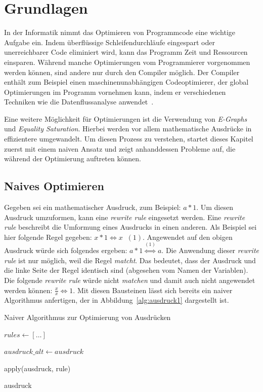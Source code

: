\section{Grundlagen}\label{sec:grundlagen}

In der Informatik nimmt das Optimieren von Programmcode eine wichtige Aufgabe ein.
Indem überflüssige Schleifendurchläufe eingespart oder unerreichbarer Code eliminiert wird,
kann das Programm Zeit und Ressourcen einsparen. 
Während manche Optimierungen vom Programmierer vorgenommen werden können, sind andere nur 
durch den Compiler möglich.
Der Compiler enthält zum Beispiel einen maschinenunabhängigen Codeoptimierer, der global Optimierungen
im Programm vornehmen kann, indem er verschiedenen Techniken wie die Datenflussanalyse anwendet~\cite{ullman2008}.

\noindent Eine weitere Möglichkeit für Optimierungen ist die Verwendung von \textit{E-Graphs} und \textit{Equality Saturation}.
Hierbei werden vor allem mathematische Ausdrücke in effizientere umgewandelt.
Um diesen Prozess zu verstehen, startet dieses Kapitel zuerst mit einem naiven Ansatz und zeigt anhanddessen Probleme auf, die
während der Optimierung auftreten können.

\subsection{Naives Optimieren}

Gegeben sei ein mathematischer Ausdruck, zum Beispiel: $a * 1$. Um diesen Ausdruck umzuformen, kann eine \textit{rewrite rule} eingesetzt werden.
Eine \textit{rewrite rule} beschreibt die Umformung eines Ausdrucks in einen anderen. Als Beispiel sei hier folgende Regel gegeben: $x * 1 \Leftrightarrow x \;\; (1)$.
Angewendet auf den obigen Ausdruck würde sich folgendes ergeben: $a * 1  \overset{(1)}{\Leftrightarrow} a$.
Die Anwendung dieser \textit{rewrite rule} ist nur möglich, weil die Regel \textit{matcht}. Das bedeutet, dass der Ausdruck und die linke Seite der Regel identisch sind 
(abgesehen vom Namen der Variablen). Die folgende \textit{rewrite rule} würde nicht \textit{matchen} und damit auch nicht angewendet werden können: $\frac{x}{x} \Leftrightarrow 1$.
Mit diesen Bausteinen lässt sich bereits ein naiver Algorithmus anfertigen, der in Abbildung~\ref{alg:ausdruck1} dargestellt ist.

\begin{algorithm}[H]
  \caption{Naiver Algorithmus zur Optimierung von Ausdrücken}\label{alg:ausdruck1}
  \begin{algorithmic}
    \State $rules \gets [\ldots]$
    
      \State $ausdruck\_alt \gets ausdruck$

        \State apply(ausdruck, rule)
        \EndIf
      \EndFor
    \EndWhile

    \State \Return ausdruck
    \EndFunction
  \end{algorithmic}
\end{algorithm}

